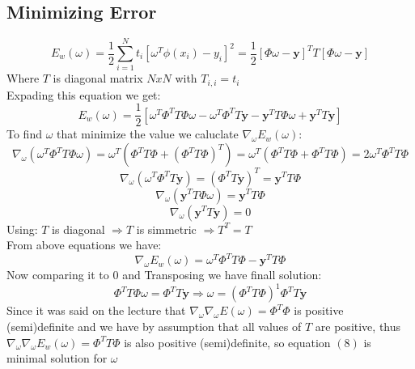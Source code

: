 \documentclass{article}
\begin{document}
\subsection{Minimizing Error}
\begin{equation}
    E_w(\omega)=\frac{1}{2}\sum_{i=1}^N t_i[\omega^T \phi(x_i)  - y_i] ^2 = 
    \frac{1}{2} [\Phi\omega - \mathbf{y}]^T T [\Phi\omega - \mathbf{y}] 
\end{equation}
Where $T$ is diagonal matrix $NxN$ with $T_{i,i} = t_i$\\
Expading this equation we get:
\begin{equation}
    E_w(\omega)= \frac{1}{2} [\omega^T\Phi^TT\Phi\omega - \omega^T\Phi^TT\mathbf{y} - \mathbf{y}^TT\Phi\omega + \mathbf{y}^TT\mathbf{y}]
\end{equation}
To find $\omega$ that minimize the value we caluclate $\nabla_\omega E_w(\omega)$:
\begin{equation}
    \nabla_\omega(\omega^T\Phi^TT\Phi\omega) = \omega^T(\Phi^TT\Phi + (\Phi^TT\Phi)^T) = \omega^T(\Phi^TT\Phi + \Phi^TT\Phi) =
    2\omega^T\Phi^TT\Phi 
\end{equation}
\begin{equation}
    \nabla_\omega(\omega^T\Phi^TT\mathbf{y}) = (\Phi^TT\mathbf{y})^T = \mathbf{y}^TT\Phi 
\end{equation}
\begin{equation}
    \nabla_\omega(\mathbf{y}^TT\Phi\omega) = \mathbf{y}^TT\Phi 
\end{equation}
\begin{equation}
    \nabla_\omega(\mathbf{y}^TT\mathbf{y}) = 0 
\end{equation}
Using: $T$ is diagonal $\Rightarrow T$ is simmetric $\Rightarrow T^T=T$\\
From above equations we have:
\begin{equation}
    \nabla_\omega E_w(\omega) = \omega^T\Phi^TT\Phi  - \mathbf{y}^TT\Phi 
\end{equation}
Now comparing it to $0$ and Transposing we have finall solution:
\begin{equation}
    \Phi^TT\Phi\omega = \Phi^TT\mathbf{y} \Rightarrow \omega=(\Phi^TT\Phi)^1\Phi^TT\mathbf{y} 
\end{equation}
Since it was said on the lecture that $\nabla_\omega \nabla_\omega E(\omega) = \Phi^T\Phi$ is positive (semi)definite and we have by 
assumption that all values of $T$ are positive, thus $\nabla_\omega \nabla_\omega E_w(\omega) = \Phi^TT\Phi$ is also positive (semi)definite, 
so equation $(8)$ is minimal solution for $\omega$  
\end{document}
